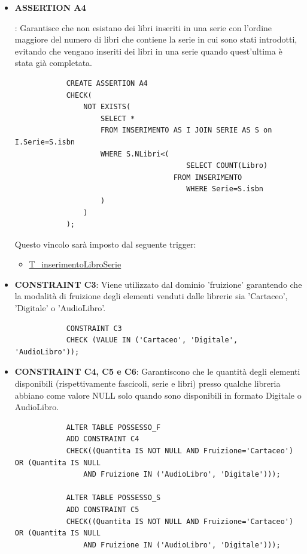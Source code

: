 \documentclass{article}
\begin{document}
\begin{itemize}
    \item \hypertarget{assertion4}{\textbf{ASSERTION A4}}: Garantisce che non esistano dei libri inseriti in una serie con l'ordine maggiore del numero di libri che contiene la serie in cui sono stati introdotti, evitando che vengano inseriti dei libri in una serie quando quest'ultima è stata già completata.
        \begin{verbatim}
            CREATE ASSERTION A4
            CHECK(
                NOT EXISTS(
                    SELECT *
                    FROM INSERIMENTO AS I JOIN SERIE AS S on I.Serie=S.isbn
                    WHERE S.NLibri<(
                    	                SELECT COUNT(Libro)
                                     FROM INSERIMENTO
                    	                WHERE Serie=S.isbn
                    )
                )
            );
        \end{verbatim}
    Questo vincolo sarà imposto dal seguente trigger:
        \begin{itemize}
            \item \hyperlink{t10}{T\_inserimentoLibroSerie}
        \end{itemize}
        
    \item \textbf{CONSTRAINT C3}: Viene utilizzato dal dominio 'fruizione' garantendo che la modalità di fruizione degli elementi venduti dalle librerie sia 'Cartaceo', 'Digitale' o 'AudioLibro'.
        \begin{verbatim}
            CONSTRAINT C3
            CHECK (VALUE IN ('Cartaceo', 'Digitale', 'AudioLibro'));
        \end{verbatim}

    \item \textbf{CONSTRAINT C4, C5 e C6}: Garantiscono che le quantità degli elementi disponibili (rispettivamente fascicoli, serie e libri) presso qualche libreria abbiano come valore NULL solo quando sono disponibili in formato Digitale o AudioLibro.
        \begin{verbatim}
            ALTER TABLE POSSESSO_F
            ADD CONSTRAINT C4
            CHECK((Quantita IS NOT NULL AND Fruizione='Cartaceo') OR (Quantita IS NULL 
                AND Fruizione IN ('AudioLibro', 'Digitale')));

            ALTER TABLE POSSESSO_S
            ADD CONSTRAINT C5
            CHECK((Quantita IS NOT NULL AND Fruizione='Cartaceo') OR (Quantita IS NULL 
                AND Fruizione IN ('AudioLibro', 'Digitale')));


\end{verbatim}
\end{itemize}
\end{document}
